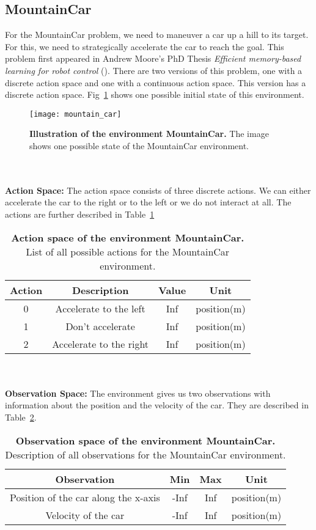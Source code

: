 \subsection{MountainCar}
For the MountainCar problem, we need to maneuver a car up a hill to its target. For this, we need to strategically accelerate the car to reach the goal. This problem first appeared in Andrew Moore's PhD Thesis \emph{Efficient memory-based learning for
robot control} (\cite{moore1990efficient}). There are two versions of this problem, one with a discrete action space and one with a continuous action space. This version has a discrete action space. Fig~\ref{fig:mountain_car} shows one possible initial state of this environment.
\begin{figure}[!ht]
  \centering
\texttt{[image: mountain\_car]}
\caption[Illustration of the environment MountainCar]{
  \textbf{Illustration of the environment MountainCar.}
  The image shows one possible state of the MountainCar environment.
}
\label{fig:mountain_car}
\end{figure}
\\ \\
\textbf{Action Space:} The action space consists of three discrete actions. We can either accelerate the car to the right or to the left or we do not interact at all. The actions are further described in Table~\ref{table:mountaincar_act}
\begin{table}[!ht]
  \centering
  \begin{tabular}{ |c|c|c|c| }
    \hline
    Action & Description & Value & Unit \\
    \hline
    0 & Accelerate to the left & Inf & position(m) \\
    1 & Don't accelerate  & Inf & position(m) \\
    2 & Accelerate to the right  & Inf & position(m) \\
    \hline
  \end{tabular}
  \caption[Action space of the environment MountainCar]{
    \textbf{Action space of the environment MountainCar.}
    List of all possible actions for the MountainCar environment.
  }
  \label{table:mountaincar_act}
\end{table}
\\ \\
\textbf{Observation Space:} The environment gives us two observations with information about the position and the velocity of the car. They are described in Table~\ref{table:mountaincar_obs}.
\begin{table}[!ht]
  \centering
  \begin{tabular}{ |c|c|c|c| }
    \hline
    Observation & Min & Max & Unit \\
    \hline
    Position of the car along the x-axis & -Inf & Inf & position(m) \\
    Velocity of the car & -Inf & Inf & position(m) \\
    \hline
  \end{tabular}
  \caption[Observation space of the environment MountainCar]{
    \textbf{Observation space of the environment MountainCar.}
    Description of all observations for the MountainCar environment.
  }
  \label{table:mountaincar_obs}
\end{table}

